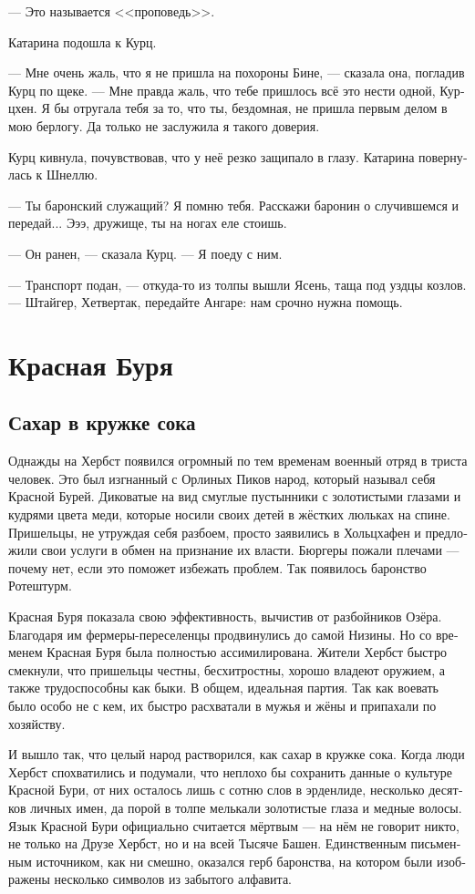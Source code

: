 \documentclass[a4paper,12pt,fleqn]{book}\usepackage{polyglossia}\setdefaultlanguage[babelshorthands=true]{russian}\setotherlanguage{english}\defaultfontfeatures{Ligatures=TeX,Mapping=tex-text}\usepackage{xcolor}\newcommand{\ml}[3]{#2}
\begin{document}
--- Это называется <<проповедь>>.

Катарина подошла к Курц.

--- Мне очень жаль, что я не пришла на похороны Бине, --- сказала она, погладив Курц по щеке.
--- Мне правда жаль, что тебе пришлось всё это нести одной, Курцхен.
Я бы отругала тебя за то, что ты, бездомная, не пришла первым делом в мою берлогу.
Да только не заслужила я такого доверия.

Курц кивнула, почувствовав, что у неё резко защипало в глазу.
Катарина повернулась к Шнеллю.

--- Ты баронский служащий?
Я помню тебя.
Расскажи баронин о случившемся и передай...
Эээ, дружище, ты на ногах еле стоишь.

--- Он ранен, --- сказала Курц.
--- Я поеду с ним.

--- Транспорт подан, --- откуда-то из толпы вышли Ясень, таща под уздцы козлов.
--- Штайгер, Хетвертак, передайте Ангаре: нам срочно нужна помощь.

\chapter{Красная Буря}

\section{Сахар в кружке сока}

Однажды на Хербст появился огромный по тем временам военный отряд в триста человек.
Это был изгнанный с Орлиных Пиков народ, который называл себя Красной Бурей.
Диковатые на вид смуглые пустынники с золотистыми глазами и кудрями цвета меди, которые носили своих детей в жёстких люльках на спине.
Пришельцы, не утруждая себя разбоем, просто заявились в Хольцхафен и предложили свои услуги в обмен на признание их власти.
Бюргеры пожали плечами --- почему нет, если это поможет избежать проблем.
Так появилось баронство Ротештурм.

Красная Буря показала свою эффективность, вычистив от разбойников Озёра.
Благодаря им фермеры-переселенцы продвинулись до самой Низины.
Но со временем Красная Буря была полностью ассимилирована.
Жители Хербст быстро смекнули, что пришельцы честны, бесхитростны, хорошо владеют оружием, а также трудоспособны как быки.
В общем, идеальная партия.
Так как воевать было особо не с кем, их быстро расхватали в мужья и жёны и припахали по хозяйству.

И вышло так, что целый народ растворился, как сахар в кружке сока.
Когда люди Хербст спохватились и подумали, что неплохо бы сохранить данные о культуре Красной Бури, от них осталось лишь с сотню слов в эрденлиде, несколько десятков личных имен, да порой в толпе мелькали золотистые глаза и медные волосы.
Язык Красной Бури официально считается мёртвым --- на нём не говорит никто, не только на Друзе Хербст, но и на всей Тысяче Башен.
Единственным письменным источником, как ни смешно, оказался герб баронства, на котором были изображены несколько символов из забытого алфавита.
\end{document}
